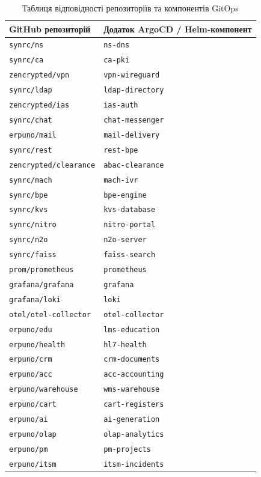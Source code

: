 \begin{table}[h!]
\small
\begin{tabular}{|l|l|}
\hline
\textbf{GitHub репозиторій} & \textbf{Додаток ArgoCD / Helm-компонент} \\ \hline
\texttt{synrc/ns} & \texttt{ns-dns} \\ \hline
\texttt{synrc/ca} & \texttt{ca-pki} \\ \hline
\texttt{zencrypted/vpn} & \texttt{vpn-wireguard} \\ \hline
\texttt{synrc/ldap} & \texttt{ldap-directory} \\ \hline
\texttt{zencrypted/ias} & \texttt{ias-auth} \\ \hline
\texttt{synrc/chat} & \texttt{chat-messenger} \\ \hline
\texttt{erpuno/mail} & \texttt{mail-delivery} \\ \hline
\texttt{synrc/rest} & \texttt{rest-bpe} \\ \hline
\texttt{zencrypted/clearance} & \texttt{abac-clearance} \\ \hline
\texttt{synrc/mach} & \texttt{mach-ivr} \\ \hline
\texttt{synrc/bpe} & \texttt{bpe-engine} \\ \hline
\texttt{synrc/kvs} & \texttt{kvs-database} \\ \hline
\texttt{synrc/nitro} & \texttt{nitro-portal} \\ \hline
\texttt{synrc/n2o} & \texttt{n2o-server} \\ \hline
\texttt{synrc/faiss} & \texttt{faiss-search} \\ \hline
\texttt{prom/prometheus} & \texttt{prometheus} \\ \hline
\texttt{grafana/grafana} & \texttt{grafana} \\ \hline
\texttt{grafana/loki} & \texttt{loki} \\ \hline
\texttt{otel/otel-collector} & \texttt{otel-collector} \\ \hline
\texttt{erpuno/edu} & \texttt{lms-education} \\ \hline
\texttt{erpuno/health} & \texttt{hl7-health} \\ \hline
\texttt{erpuno/crm} & \texttt{crm-documents} \\ \hline
\texttt{erpuno/acc} & \texttt{acc-accounting} \\ \hline
\texttt{erpuno/warehouse} & \texttt{wms-warehouse} \\ \hline
\texttt{erpuno/cart} & \texttt{cart-registers} \\ \hline
\texttt{erpuno/ai} & \texttt{ai-generation} \\ \hline
\texttt{erpuno/olap} & \texttt{olap-analytics} \\ \hline
\texttt{erpuno/pm} & \texttt{pm-projects} \\ \hline
\texttt{erpuno/itsm} & \texttt{itsm-incidents} \\ \hline
\end{tabular}
\caption{Таблиця відповідності репозиторіїв та компонентів GitOps}
\end{table}

